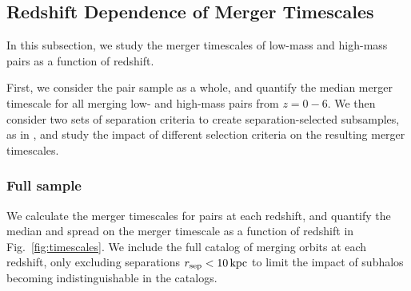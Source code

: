\documentclass[twocolumn,linenumbers]{aastex631}
\newcommand{\chambe}{\citet{Chamberlain2024}}
\begin{document}
    
    
    
    
\subsection{Redshift Dependence of Merger Timescales}\label{sec:results-timevredshift}
    In this subsection, we study the merger timescales of low-mass and high-mass pairs as a function of redshift. 
    
    First, we consider the pair sample as a whole, and quantify the median merger timescale for all merging low- and high-mass pairs from $z=0-6$. 
    We then consider two sets of separation criteria to create separation-selected subsamples, as in \chambe{}, and study the impact of different selection criteria on the resulting merger timescales. 
    

    \subsubsection{Full sample}
        We calculate the merger timescales for pairs at each redshift, and quantify the median and spread on the merger timescale as a function of redshift in Fig.~\ref{fig:timescales}. 
        We include the full catalog of merging orbits at each redshift, only excluding separations $r_{\mathrm{sep}}<10\mathrm{\,kpc}$ to limit the impact of subhalos becoming indistinguishable in the \subfind{} catalogs.%
\end{document}
